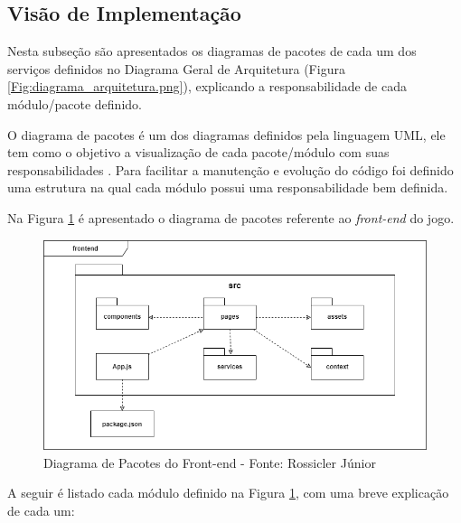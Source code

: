 {\subsection{Visão de Implementação}
\label{ssec:visao_implementacao}

Nesta subseção são apresentados os diagramas de pacotes de cada um dos serviços definidos no Diagrama Geral de Arquitetura (Figura \ref{Fig:diagrama_arquitetura.png}), explicando a responsabilidade de cada módulo/pacote definido.

O diagrama de pacotes é um dos diagramas definidos pela linguagem UML, ele tem como o objetivo a visualização de cada pacote/módulo com suas responsabilidades \cite{guedes2018uml}. Para facilitar a manutenção e evolução do código foi definido uma estrutura na qual cada módulo possui uma responsabilidade bem definida.

Na Figura \ref{Fig:diagrama_pacotes_front.png} é apresentado o diagrama de pacotes referente ao \textit{front-end} do jogo.

\begin{figure}[htbp]
	\centering
		\includegraphics[keepaspectratio=true,scale=0.56]{figuras/arquitetura/diagrama_pacotes_frontend.png}
		\caption{\textcolor{textadded}{Diagrama de Pacotes do Front-end - Fonte: Rossicler Júnior}}
	\label{Fig:diagrama_pacotes_front.png}
\end{figure}

A seguir é listado cada módulo definido na Figura \ref{Fig:diagrama_pacotes_front.png}, com uma breve explicação de cada um:

}
